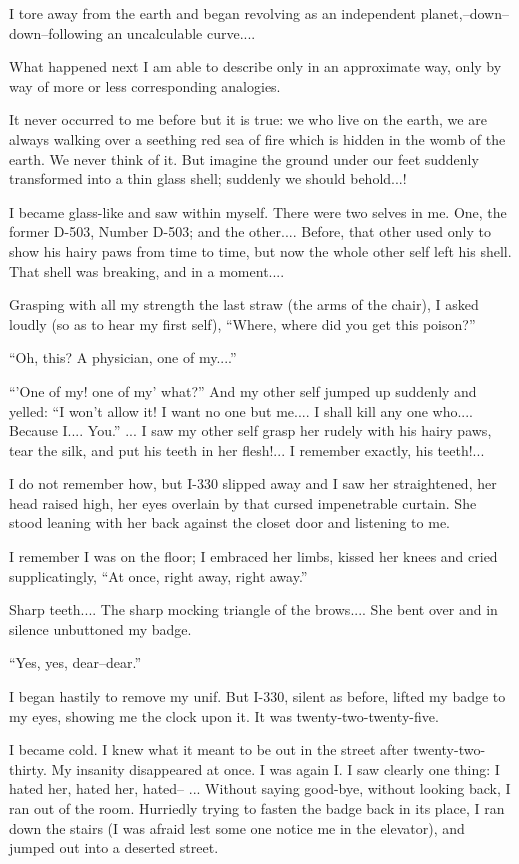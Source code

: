 \documentclass[11pt,openany]{book}
\begin{document}
I tore away from the earth and began revolving as an independent planet,--down--down--following an uncalculable curve....

What happened next I am able to describe only in an approximate way, only by way of more or less corresponding analogies.

It never occurred to me before but it is true: we who live on the earth, we are always walking over a seething red sea of fire which is hidden in the womb of the earth. We never think of it. But imagine the ground under our feet suddenly transformed into a thin glass shell; suddenly we should behold...!

I became glass-like and saw within myself. There were two selves in me. One, the former D-503, Number D-503; and the other.... Before, that other used only to show his hairy paws from time to time, but now the whole other self left his shell. That shell was breaking, and in a moment....

Grasping with all my strength the last straw (the arms of the chair), I asked loudly (so as to hear my first self), ``Where, where did you get this poison?''

``Oh, this? A physician, one of my....''

``'One of my! one of my' what?'' And my other self jumped up suddenly and yelled: ``I won't allow it! I want no one but me.... I shall kill any one who.... Because I.... You.'' ... I saw my other self grasp her rudely with his hairy paws, tear the silk, and put his teeth in her flesh!... I remember exactly, his teeth!...

I do not remember how, but I-330 slipped away and I saw her straightened, her head raised high, her eyes overlain by that cursed impenetrable curtain. She stood leaning with her back against the closet door and listening to me.

I remember I was on the floor; I embraced her limbs, kissed her knees and cried supplicatingly, ``At once, right away, right away.''

Sharp teeth.... The sharp mocking triangle of the brows.... She bent over and in silence unbuttoned my badge.

``Yes, yes, dear--dear.''

I began hastily to remove my unif. But I-330, silent as before, lifted my badge to my eyes, showing me the clock upon it. It was twenty-two-twenty-five.

I became cold. I knew what it meant to be out in the street after twenty-two-thirty. My insanity disappeared at once. I was again I. I saw clearly one thing: I hated her, hated her, hated-- ... Without saying good-bye, without looking back, I ran out of the room. Hurriedly trying to fasten the badge back in its place, I ran down the stairs (I was afraid lest some one notice me in the elevator), and jumped out into a deserted street.
\end{document}
